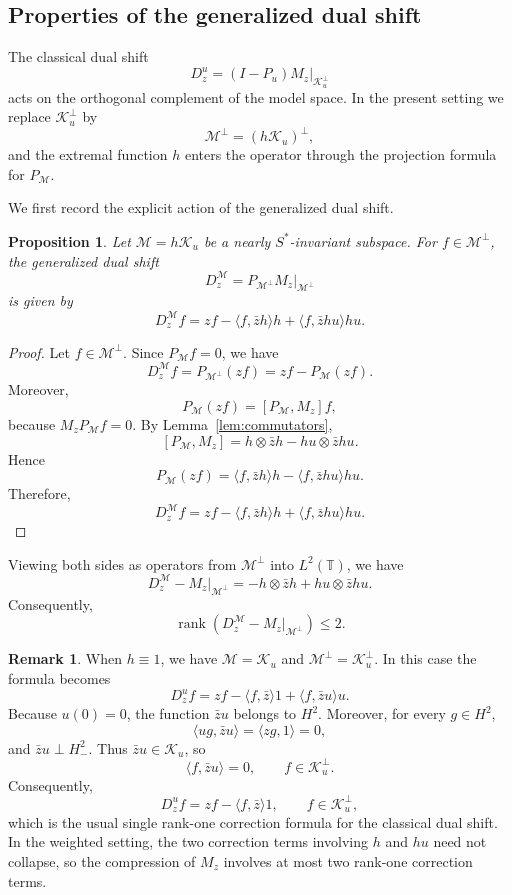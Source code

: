 \documentclass[12pt]{amsart}
\newtheorem{proposition}[theorem]{Proposition}
\theoremstyle{definition}
\newtheorem{remark}[theorem]{Remark}
\theoremstyle{remark}
\def \T{\mathbb{T}}
\newcommand{\clm}{\mathcal{M}}
\newcommand{\clk}{\mathcal{K}}
\newcommand\restr[2]{\ensuremath{\left.#1\right|_{#2}}}
\numberwithin{equation}{section}
\begin{document}
\subsection{Properties of the generalized dual shift}

The classical dual shift
\[
D_z^u=(I-P_u)M_z\big|_{\clk_u^\perp}
\]
acts on the orthogonal complement of the model space. In the present setting we replace $\clk_u^\perp$ by
\[
\clm^\perp=(h\clk_u)^\perp,
\]
and the extremal function $h$ enters the operator through the projection formula for $P_\clm$.

We first record the explicit action of the generalized dual shift.

\begin{proposition}\label{prop:dual_shift_action}
Let $\clm=h\clk_u$ be a nearly $S^*$-invariant subspace. For $f\in\clm^\perp$, the generalized dual shift
\[
D_z^\clm=P_{\clm^\perp}M_z\big|_{\clm^\perp}
\]
is given by
\[
D_z^\clm f
=
zf-\langle f,\bar{z} h\rangle h
+
\langle f,\bar{z} hu\rangle hu.
\]
\end{proposition}

\begin{proof}
Let $f\in\clm^\perp$. Since $P_\clm f=0$, we have
\[
D_z^\clm f
=
P_{\clm^\perp}(zf)
=
zf-P_\clm(zf).
\]
Moreover,
\[
P_\clm(zf)
=
[P_\clm,M_z]f,
\]
because $M_zP_\clm f=0$. By Lemma~\ref{lem:commutators},
\[
[P_\clm,M_z]
=
h\otimes \bar{z} h
-
hu\otimes \bar{z} hu.
\]
Hence
\[
P_\clm(zf)
=
\langle f,\bar{z} h\rangle h
-
\langle f,\bar{z} hu\rangle hu.
\]
Therefore,
\[
D_z^\clm f
=
zf-\langle f,\bar{z} h\rangle h
+
\langle f,\bar{z} hu\rangle hu.
\]
\end{proof}
Viewing both sides as operators from $\clm^\perp$ into $L^2(\T)$,
we have
\[
D_z^\clm-\restr{M_z}{\clm^\perp}
=
-h\otimes\bar zh
+
hu\otimes\bar zhu.
\]
Consequently,
\[
\operatorname{rank}
\left( D_z^\clm-\restr{M_z}{\clm^\perp} \right) \leq2.
\]
\begin{remark}
When $h\equiv 1$, we have $\clm=\clk_u$ and
$\clm^\perp=\clk_u^\perp$. In this case the formula becomes
\[
D_z^u f
=
zf-\langle f,\bar{z}\rangle 1
+
\langle f,\bar{z} u\rangle u.
\]
Because $u(0)=0$, the function $\bar zu$ belongs to $H^2$. Moreover, for
every $g\in H^2$,
\[
\langle ug,\bar zu\rangle=\langle zg,1\rangle=0,
\]
and $\bar zu\perp H_{-}^2$. Thus $\bar zu\in\clk_u$, so
\[
\langle f,\bar zu\rangle=0,
\qquad f\in\clk_u^\perp.
\]
Consequently,
\[
D_z^u f=zf-\langle f,\bar z\rangle 1,
\qquad f\in\clk_u^\perp,
\]
which is the usual single rank-one correction formula for the classical dual shift. In the weighted setting, the two correction terms involving $h$ and $hu$ need not collapse, so the compression of $M_z$ involves at most two rank-one correction terms.
\end{remark}
\end{document}
